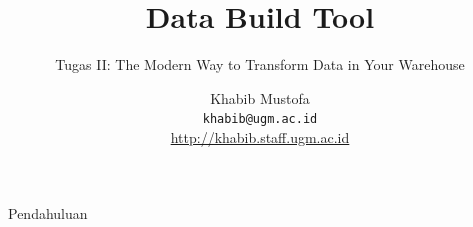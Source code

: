 \documentclass[xcolor=table,t,aspectratio=169]{beamer}
\title[Tugas II:DBT]{Data Build Tool}
\subtitle{Tugas II: The Modern Way to Transform Data in Your Warehouse}
\date{}
\author[Mustofa]{Khabib Mustofa \\
\small{\texttt{khabib@ugm.ac.id}} \\
\url{http://khabib.staff.ugm.ac.id}
}
\institute[UGM, Yogyakarta, Indonesia]{Dept of  Computer Science and Electronics, Universitas Gadjah Mada}
\begin{document}
\frame{ \titlepage}
\begin{frame}{Pendahuluan}
\footnotesize
    
\end{frame}
\end{document}
